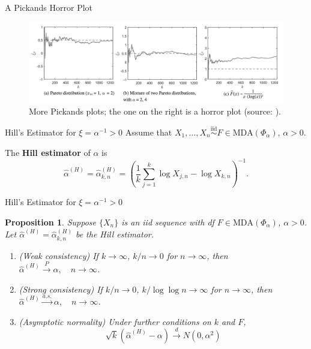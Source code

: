 \documentclass{beamer}
\newcommand{\MDA}{\text{MDA}}
\newtheorem{proposition}{Proposition}
\begin{document}
\begin{frame}{A Pickands Horror Plot}
    \begin{figure}
        \centering
        \includegraphics[scale=0.32]{pickands_horror_plots.png}
        \caption{More Pickands plots; the one on the right is a horror plot (source: \cite{nair_et_al_2022}).}
        \label{fig:pickands_horror_plots}
    \end{figure}
\end{frame}

\begin{frame}{Hill's Estimator for $\xi = \alpha^{-1} > 0$}
    Assume that $X_1, \ldots, X_n \overset{\text{iid}}{\sim} F \in \MDA(\Phi_{\alpha})$, $\alpha > 0$.

    \medskip

    The \textbf{Hill estimator} of $\alpha$ is
    \[
    \hat{\alpha}^{(H)} = \hat{\alpha}_{k, n}^{(H)} = \left(\frac{1}{k}\sum_{j = 1}^k \log X_{j, n} - \log X_{k, n}\right)^{-1}.
    \]
\end{frame}

\begin{frame}{Hill's Estimator for $\xi = \alpha^{-1} > 0$}
    \begin{proposition}
        Suppose $\{X_n\}$ is an iid sequence with df $F \in \MDA(\Phi_{\alpha})$, $\alpha > 0$. Let $\hat{\alpha}^{(H)} = \hat{\alpha}_{k, n}^{(H)}$ be the Hill estimator.
        \begin{enumerate}
            \item[(a)] (Weak consistency) If $k \to \infty$, $k / n \to 0$ for $n \to \infty$, then $\hat{\alpha}^{(H)} \xrightarrow{P} \alpha, \quad n \to \infty$.
            \item[(b)] (Strong consistency) If $k / n \to 0$, $k / \log\log n \to \infty$ for $n \to \infty$, then 
            $\hat{\alpha}^{(H)} \xrightarrow{a.s.} \alpha, \quad n \to \infty$.
            \item[(c)] (Asymptotic normality) Under further conditions on $k$ and $F$,
            \[
            \sqrt{k}(\hat{\alpha}^{(H)} - \alpha) \xrightarrow{d} N(0, \alpha^2)
            \]
        \end{enumerate}
    \end{proposition}    
\end{frame}
\end{document}
